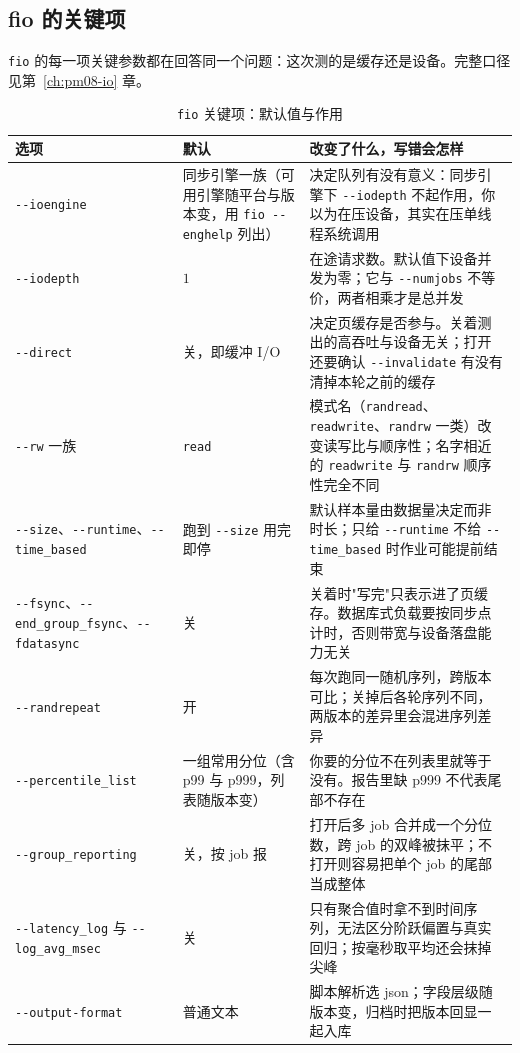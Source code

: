 \documentclass[12pt,a4paper,fontset=fandol]{ctexbook}
\newcommand{\Tp}[1]{\texttt{#1}}
\newcommand{\Opt}[1]{\texttt{-\/-#1}}
\newcommand{\Bk}{\discretionary{}{}{}}
\newcommand{\Mx}[1]{\textsf{#1}}
\begin{document}
\subsection{fio 的关键项}
\label{sub:pmapB-fio}

\Tp{fio} 的每一项关键参数都在回答同一个问题：这次测的是缓存还是设备。完整口径见第~\ref{ch:pm08-io} 章。

\begin{table}[htbp]
\centering
\small
\begin{tabularx}{\textwidth}{>{\raggedright\arraybackslash}p{} >{\raggedright\arraybackslash}p{} >{\raggedright\arraybackslash}X}
\toprule
选项 & 默认 & 改变了什么，写错会怎样 \\
\midrule
\Opt{ioengine} & 同步引擎一族（可用引擎随平台与版本变，用 \Tp{fio -{\Bk}-{\Bk}enghelp} 列出） & 决定队列有没有意义：同步引擎下 \Opt{iodepth} 不起作用，你以为在压设备，其实在压单线程系统调用 \\
\Opt{iodepth} & $1$ & 在途请求数。默认值下设备并发为零；它与 \Opt{numjobs} 不等价，两者相乘才是总并发 \\
\Opt{direct} & 关，即缓冲 I/O & 决定页缓存是否参与。关着测出的高吞吐与设备无关；打开还要确认 \Opt{invalidate} 有没有清掉本轮之前的缓存 \\
\Opt{rw} 一族 & \Tp{read} & 模式名（\Tp{randread}、\Tp{readwrite}、\Tp{randrw} 一类）改变读写比与顺序性；名字相近的 \Tp{readwrite} 与 \Tp{randrw} 顺序性完全不同 \\
\Opt{size}、\Opt{runtime}、\Opt{time\_{\Bk}based} & 跑到 \Opt{size} 用完即停 & 默认样本量由数据量决定而非时长；只给 \Opt{runtime} 不给 \Opt{time\_{\Bk}based} 时作业可能提前结束 \\
\Opt{fsync}、\Opt{end\_{\Bk}group\_{\Bk}fsync}、\Opt{fdatasync} & 关 & 关着时"写完"只表示进了页缓存。数据库式负载要按同步点计时，否则带宽与设备落盘能力无关 \\
\Opt{randrepeat} & 开 & 每次跑同一随机序列，跨版本可比；关掉后各轮序列不同，两版本的差异里会混进序列差异 \\
\Opt{percentile\_{\Bk}list} & 一组常用分位（含 \Mx{p99} 与 \Mx{p999}，列表随版本变） & 你要的分位不在列表里就等于没有。报告里缺 \Mx{p999} 不代表尾部不存在 \\
\Opt{group\_{\Bk}reporting} & 关，按 job 报 & 打开后多 job 合并成一个分位数，跨 job 的双峰被抹平；不打开则容易把单个 job 的尾部当成整体 \\
\Opt{latency\_{\Bk}log} 与 \Opt{log\_{\Bk}avg\_{\Bk}msec} & 关 & 只有聚合值时拿不到时间序列，无法区分阶跃偏置与真实回归；按毫秒取平均还会抹掉尖峰 \\
\Opt{output-{\Bk}format} & 普通文本 & 脚本解析选 json；字段层级随版本变，归档时把版本回显一起入库 \\
\end{tabularx}
\caption{\Tp{fio} 关键项：默认值与作用}
\label{tab:pmapB-fio}
\end{table}
\end{document}
